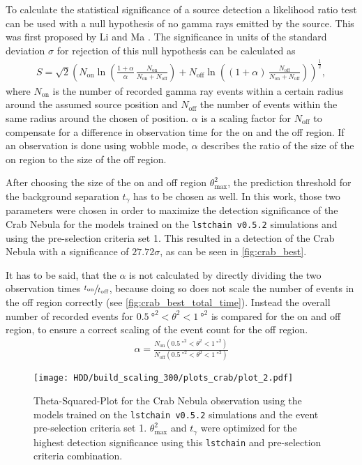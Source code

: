 To calculate the statistical significance of a source detection a likelihood ratio test can be used with a null hypothesis of no gamma rays emitted by the source.
This was first proposed by Li and Ma \cite{Li_Ma}.
The significance in units of the standard deviation $\sigma$ for rejection of this null hypothesis can be calculated as
\begin{align}
    S = \sqrt{2} \left( 
        N_\text{on} \ln\left( \frac{1 + \alpha}{\alpha}\, \frac{N_\text{on}}{N_\text{on} + N_\text{off}} \right) + 
        N_\text{off} \ln\left( (1 + \alpha)\, \frac{N_\text{off}}{N_\text{on} + N_\text{off}} \right) 
    \right)^{\frac{1}{2}},
\end{align}
where $N_\text{on}$ is the number of recorded gamma ray events within a certain radius around the assumed source position and $N_\text{off}$ the number of events within 
the same radius around the chosen of position. 
$\alpha$ is a scaling factor for $N_\text{off}$ to compensate for a difference in observation time for the on and the off region.
If an observation is done using wobble mode, $\alpha$ describes the ratio of the size of the on region to the size of the off region.

After choosing the size of the on and off region $\theta_\text{max}^2$, the prediction threshold for the background separation $t_\gamma$ has to be chosen as well.
In this work, those two parameters were chosen in order to maximize the detection significance of the Crab Nebula for the models trained on the 
\texttt{lstchain v0.5.2} simulations and using the pre-selection criteria set 1.
This resulted in a detection of the Crab Nebula with a significance of $\num{27.72} \sigma$, as can be seen in \autoref{fig:crab_best}.

It has to be said, that the $\alpha$ is not calculated by directly dividing the two observation times $\sfrac{t_\text{on}}{t_\text{off}}$, because doing so 
does not scale the number of events in the off region correctly (see \autoref{fig:crab_best_total_time}).
Instead the overall number of recorded events for $\SI{0.5}{\degree\squared} < \theta^2 < \SI{1}{\degree\squared}$ is compared for the on and off region,
to ensure a correct scaling of the event count for the off region.
\begin{align}
    \alpha = \frac{N_\text{on}(\SI{0.5}{\degree\squared} < \theta^2 < \SI{1}{\degree\squared})}{N_\text{off}(\SI{0.5}{\degree\squared} < \theta^2 < \SI{1}{\degree\squared})}
\end{align}
\begin{figure}
    \centering
    \texttt{[image: HDD/build\_scaling\_300/plots\_crab/plot\_2.pdf]}
    \caption{Theta-Squared-Plot for the Crab Nebula observation using the models trained on the \texttt{lstchain v0.5.2} simulations and the event pre-selection criteria set 1.
        $\theta_\text{max}^2$ and $t_\gamma$ were optimized for the highest detection significance using this \texttt{lstchain} and pre-selection criteria combination.
    }
    \label{fig:crab_best}
\end{figure}

